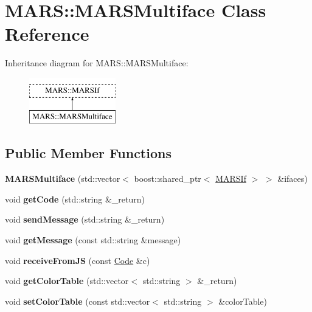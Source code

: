 \hypertarget{classMARS_1_1MARSMultiface}{}\section{M\+A\+RS\+:\+:M\+A\+R\+S\+Multiface Class Reference}
\label{classMARS_1_1MARSMultiface}
Inheritance diagram for M\+A\+RS\+:\+:M\+A\+R\+S\+Multiface\+:\begin{figure}[H]
\begin{center}
\leavevmode
\includegraphics[height=2.000000cm]{classMARS_1_1MARSMultiface}
\end{center}
\end{figure}
\subsection*{Public Member Functions}
\begin{DoxyCompactItemize}
\item 
\mbox{\label{classMARS_1_1MARSMultiface_a887e7159fba8bf9c71e49eb537c74722}} 
{\bfseries M\+A\+R\+S\+Multiface} (std\+::vector$<$ boost\+::shared\+\_\+ptr$<$ \hyperlink{classMARS_1_1MARSIf}{M\+A\+R\+S\+If} $>$ $>$ \&ifaces)
\item 
\mbox{\label{classMARS_1_1MARSMultiface_a2536d45efd4861530b4de8ad4a6741e2}} 
void {\bfseries get\+Code} (std\+::string \&\+\_\+return)
\item 
\mbox{\label{classMARS_1_1MARSMultiface_af6152624ee8ebb1885c8ea941ff6a50c}} 
void {\bfseries send\+Message} (std\+::string \&\+\_\+return)
\item 
\mbox{\label{classMARS_1_1MARSMultiface_a83560afc009f11281238af7f00e483a4}} 
void {\bfseries get\+Message} (const std\+::string \&message)
\item 
\mbox{\label{classMARS_1_1MARSMultiface_a2c514419a0c3eeba1336fb7aaac4bdda}} 
void {\bfseries receive\+From\+JS} (const \hyperlink{classMARS_1_1Code}{Code} \&c)
\item 
\mbox{\label{classMARS_1_1MARSMultiface_ad1fd464ed427ca30b3fcb7cc5e40b53f}} 
void {\bfseries get\+Color\+Table} (std\+::vector$<$ std\+::string $>$ \&\+\_\+return)
\item 
\mbox{\label{classMARS_1_1MARSMultiface_a4849eaef827f6dfb4cbac9697da697d5}} 
void {\bfseries set\+Color\+Table} (const std\+::vector$<$ std\+::string $>$ \&color\+Table)
\end{DoxyCompactItemize}
